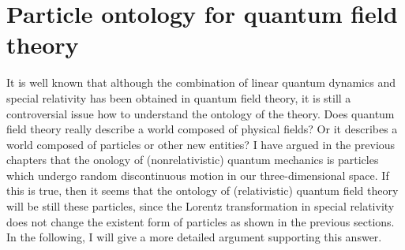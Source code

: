 
\section{Particle ontology for quantum field theory}

It is well known that although the combination of linear quantum dynamics and special relativity has been obtained in quantum field theory, it is still a controversial issue how to understand the ontology of the theory. Does quantum field theory really describe a world composed of physical fields? Or it describes a world composed of particles or other new entities? 
I have argued in the previous chapters that the onology of (nonrelativistic) quantum mechanics is particles which undergo random discontinuous motion in our three-dimensional space.
If this is true, then it seems that the ontology of (relativistic) quantum field theory will be still these particles, since the Lorentz transformation in special relativity does not change the existent form of particles as shown in the previous sections.
In the following, I will give a more detailed argument supporting this answer.

